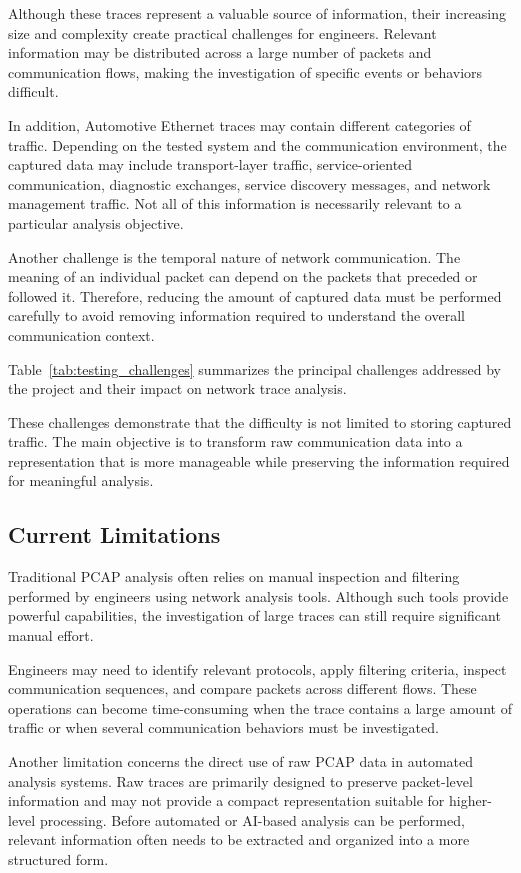 Although these traces represent a valuable source of information, their increasing size and complexity create practical challenges for engineers. Relevant information may be distributed across a large number of packets and communication flows, making the investigation of specific events or behaviors difficult.

In addition, Automotive Ethernet traces may contain different categories of traffic. Depending on the tested system and the communication environment, the captured data may include transport-layer traffic, service-oriented communication, diagnostic exchanges, service discovery messages, and network management traffic. Not all of this information is necessarily relevant to a particular analysis objective.

Another challenge is the temporal nature of network communication. The meaning of an individual packet can depend on the packets that preceded or followed it. Therefore, reducing the amount of captured data must be performed carefully to avoid removing information required to understand the overall communication context.

Table~\ref{tab:testing_challenges} summarizes the principal challenges addressed by the project and their impact on network trace analysis.



These challenges demonstrate that the difficulty is not limited to storing captured traffic. The main objective is to transform raw communication data into a representation that is more manageable while preserving the information required for meaningful analysis.

\subsection{Current Limitations}

Traditional PCAP analysis often relies on manual inspection and filtering performed by engineers using network analysis tools. Although such tools provide powerful capabilities, the investigation of large traces can still require significant manual effort.

Engineers may need to identify relevant protocols, apply filtering criteria, inspect communication sequences, and compare packets across different flows. These operations can become time-consuming when the trace contains a large amount of traffic or when several communication behaviors must be investigated.

Another limitation concerns the direct use of raw PCAP data in automated analysis systems. Raw traces are primarily designed to preserve packet-level information and may not provide a compact representation suitable for higher-level processing. Before automated or AI-based analysis can be performed, relevant information often needs to be extracted and organized into a more structured form.

